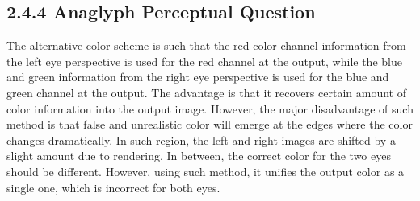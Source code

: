 \documentclass[11pt]{article}
\begin{document}
\subsection*{2.4.4 Anaglyph Perceptual Question}
The alternative color scheme is such that the red color channel information from the left eye perspective is used for the red channel at the output, while the blue and green information from the right eye perspective is used for the blue and green channel at the output. The advantage is that it recovers certain amount of color information into the output image. However, the major disadvantage of such method is that false and unrealistic color will emerge at the edges where the color changes dramatically. In such region, the left and right images are shifted by a slight amount due to rendering. In between, the correct color for the two eyes should be different. However, using such method, it unifies the output color as a single one, which is incorrect for both eyes. 
\end{document}
